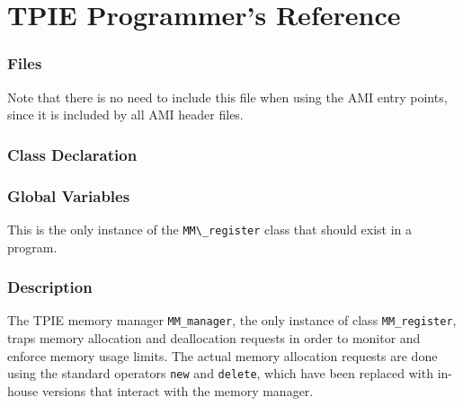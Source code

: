 
\chapter{TPIE Programmer's Reference}





\subsection{Files}
  \btabb
     {Note that there is no need to
include this file when using the AMI entry points, since it is included by
all AMI header files.}
  \etabb

\subsection{Class Declaration}
  \btabb
     {}
  \etabb

\subsection{Global Variables}
  \btabb
     {This is the only instance of
the \lstinline|MM\_register| class that should exist in a program.}
  \etabb

\subsection{Description}
The TPIE memory manager \lstinline|MM_manager|, the only instance of class
\lstinline|MM_register|, traps memory allocation and deallocation requests in
order to monitor and enforce memory usage limits. The actual memory
allocation requests are done using the standard \CPP{} operators \lstinline|new|
and \lstinline|delete|, which have been replaced with in-house versions that
interact with the memory manager.

